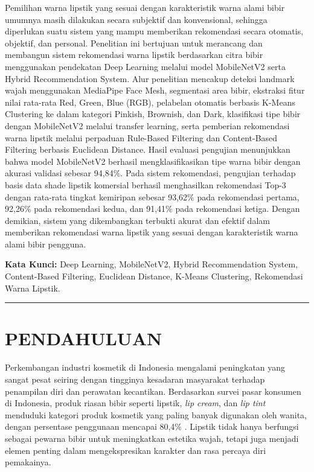 \documentclass[10pt,a4paper]{article}
\begin{document}
{\fontsize{9.5pt}{12pt}\selectfont
Pemilihan warna lipstik yang sesuai dengan karakteristik warna alami bibir umumnya masih dilakukan secara subjektif dan konvensional, sehingga diperlukan suatu sistem yang mampu memberikan rekomendasi secara otomatis, objektif, dan personal. Penelitian ini bertujuan untuk merancang dan membangun sistem rekomendasi warna lipstik berdasarkan citra bibir menggunakan pendekatan Deep Learning melalui model MobileNetV2 serta Hybrid Recommendation System. Alur penelitian mencakup deteksi landmark wajah menggunakan MediaPipe Face Mesh, segmentasi area bibir, ekstraksi fitur nilai rata-rata Red, Green, Blue (RGB), pelabelan otomatis berbasis K-Means Clustering ke dalam kategori Pinkish, Brownish, dan Dark, klasifikasi tipe bibir dengan MobileNetV2 melalui transfer learning, serta pemberian rekomendasi warna lipstik melalui perpaduan Rule-Based Filtering dan Content-Based Filtering berbasis Euclidean Distance. Hasil evaluasi pengujian menunjukkan bahwa model MobileNetV2 berhasil mengklasifikasikan tipe warna bibir dengan akurasi validasi sebesar 94,84\%. Pada sistem rekomendasi, pengujian terhadap basis data shade lipstik komersial berhasil menghasilkan rekomendasi Top-3 dengan rata-rata tingkat kemiripan sebesar 93,62\% pada rekomendasi pertama, 92,26\% pada rekomendasi kedua, dan 91,41\% pada rekomendasi ketiga. Dengan demikian, sistem yang dikembangkan terbukti akurat dan efektif dalam memberikan rekomendasi warna lipstik yang sesuai dengan karakteristik warna alami bibir pengguna.\par}

\vspace{4pt}
{\fontsize{9.5pt}{12pt}\selectfont\textbf{Kata Kunci:} Deep Learning, MobileNetV2, Hybrid Recommendation System, Content-Based Filtering, Euclidean Distance, K-Means Clustering, Rekomendasi Warna Lipstik.\par}

\vspace{3pt}
\noindent\rule{\textwidth}{0.4pt}
\vspace{4pt}

\section{PENDAHULUAN}

Perkembangan industri kosmetik di Indonesia mengalami peningkatan yang sangat pesat seiring dengan tingginya kesadaran masyarakat terhadap penampilan diri dan perawatan kecantikan. Berdasarkan survei pasar konsumen di Indonesia, produk riasan bibir seperti lipstik, \textit{lip cream}, dan \textit{lip tint} menduduki kategori produk kosmetik yang paling banyak digunakan oleh wanita, dengan persentase penggunaan mencapai 80,4\% \cite{jakpat2025}. Lipstik tidak hanya berfungsi sebagai pewarna bibir untuk meningkatkan estetika wajah, tetapi juga menjadi elemen penting dalam mengekspresikan karakter dan rasa percaya diri pemakainya.
\end{document}
